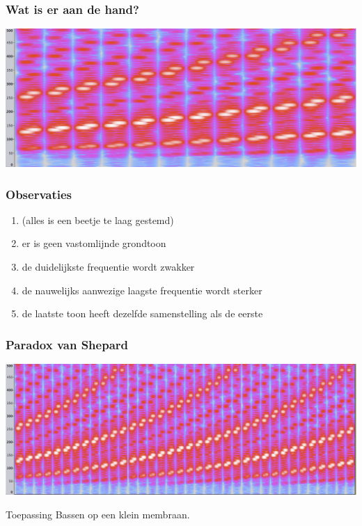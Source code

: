 \documentclass[compress, darktitle, framenumber, totalframenumber, handout]{beamer}
\begin{document}
\begin{frame}
  \frametitle{Wat is er aan de hand?}

  \includegraphics[width=\textwidth]{images/endless-once.png}
\end{frame}

\begin{frame}
  \frametitle{Observaties}

  \begin{enumerate}
    \item (alles is een beetje te laag gestemd)
    \item er is geen vastomlijnde grondtoon
    \item de duidelijkste frequentie wordt \alert{zwakker}
    \item de nauwelijks aanwezige laagste frequentie wordt \alert{sterker}
    \item de laatste toon heeft dezelfde samenstelling als de eerste
  \end{enumerate}
\end{frame}

\begin{frame}
  \frametitle{Paradox van Shepard}

  \includegraphics[width=\textwidth]{images/endless-copies.png}

  \begin{block}{Toepassing}
    Bassen op een klein membraan.
  \end{block}
\end{frame}
\end{document}
